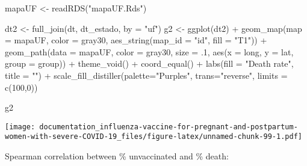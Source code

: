 \documentclass[
]{article}
\newenvironment{Shaded}{\begin{snugshade}}{\end{snugshade}}
\newcommand{\AttributeTok}[1]{\textcolor[rgb]{0.77,0.63,0.00}{#1}}
\newcommand{\DecValTok}[1]{\textcolor[rgb]{0.00,0.00,0.81}{#1}}
\newcommand{\FloatTok}[1]{\textcolor[rgb]{0.00,0.00,0.81}{#1}}
\newcommand{\FunctionTok}[1]{\textcolor[rgb]{0.00,0.00,0.00}{#1}}
\newcommand{\NormalTok}[1]{#1}
\newcommand{\OtherTok}[1]{\textcolor[rgb]{0.56,0.35,0.01}{#1}}
\newcommand{\SpecialCharTok}[1]{\textcolor[rgb]{0.00,0.00,0.00}{#1}}
\newcommand{\StringTok}[1]{\textcolor[rgb]{0.31,0.60,0.02}{#1}}
\begin{document}
\begin{Shaded}
\begin{Highlighting}[]
\NormalTok{mapaUF }\OtherTok{\textless{}{-}} \FunctionTok{readRDS}\NormalTok{(}\StringTok{"mapaUF.Rds"}\NormalTok{)}

\NormalTok{dt2 }\OtherTok{\textless{}{-}} \FunctionTok{full\_join}\NormalTok{(dt, dt\_estado, }\AttributeTok{by =} \StringTok{"uf"}\NormalTok{)}
\NormalTok{g2 }\OtherTok{\textless{}{-}} \FunctionTok{ggplot}\NormalTok{(dt2) }\SpecialCharTok{+}
  \FunctionTok{geom\_map}\NormalTok{(}\AttributeTok{map =}\NormalTok{ mapaUF, }\AttributeTok{color =} \StringTok{\textquotesingle{}gray30\textquotesingle{}}\NormalTok{, }\FunctionTok{aes\_string}\NormalTok{(}\AttributeTok{map\_id =} \StringTok{"id"}\NormalTok{, }\AttributeTok{fill =} \StringTok{"T1"}\NormalTok{)) }\SpecialCharTok{+}
  \FunctionTok{geom\_path}\NormalTok{(}\AttributeTok{data =}\NormalTok{ mapaUF, }\AttributeTok{color =} \StringTok{\textquotesingle{}gray30\textquotesingle{}}\NormalTok{, }\AttributeTok{size =}\NormalTok{ .}\DecValTok{1}\NormalTok{, }\FunctionTok{aes}\NormalTok{(}\AttributeTok{x =}\NormalTok{ long, }\AttributeTok{y =}\NormalTok{ lat, }\AttributeTok{group =}\NormalTok{ group)) }\SpecialCharTok{+} 
  \FunctionTok{theme\_void}\NormalTok{() }\SpecialCharTok{+} \FunctionTok{coord\_equal}\NormalTok{() }\SpecialCharTok{+} 
  \FunctionTok{labs}\NormalTok{(}\AttributeTok{fill =} \StringTok{"Death rate"}\NormalTok{, }\AttributeTok{title =} \StringTok{""}\NormalTok{)  }\SpecialCharTok{+} 
  \FunctionTok{scale\_fill\_distiller}\NormalTok{(}\AttributeTok{palette=}\StringTok{"Purples"}\NormalTok{, }\AttributeTok{trans=}\StringTok{"reverse"}\NormalTok{, }\AttributeTok{limits =} \FunctionTok{c}\NormalTok{(}\DecValTok{100}\NormalTok{,}\DecValTok{0}\NormalTok{)) }

\NormalTok{g2}
\end{Highlighting}
\end{Shaded}

\texttt{[image: documentation\_influenza-vaccine-for-pregnant-and-postpartum-women-with-severe-COVID-19\_files/figure-latex/unnamed-chunk-99-1.pdf]}

Spearman correlation between \% unvaccinated and \% death:

\begin{Shaded}
\end{Shaded}
\end{document}
